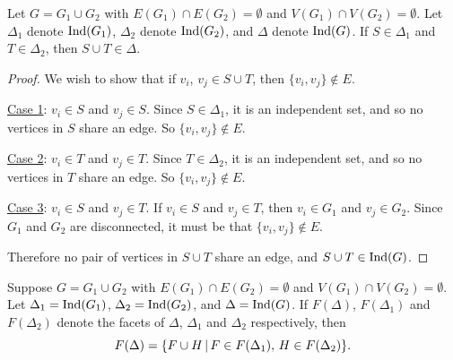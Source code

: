 \begin{lemma} \label{lem:ind-sets-union}
Let $G = G_1 \cup G_2$ with $E(G_1) \cap E(G_2) = \emptyset$ and $V(G_1) \cap V(G_2) = \emptyset$. Let $\Delta_1$ denote $\textrm{Ind}(G_1)$, $\Delta_2$ denote $\textrm{Ind}(G_2)$, and $\Delta$ denote $\textrm{Ind}(G)$. If $S \in \Delta_1$ and $T \in \Delta_2$, then $S \cup T \in \Delta$.  
\end{lemma}

\begin{proof} We wish to show that if $v_i$, $v_j \in S \cup T$, then  $\{v_i, v_j\} \not \in E$. 

\noindent
\underline{Case 1}: $v_i \in S$ and $v_j \in S$.
Since $S \in \Delta_1$, it is an independent set, and so no vertices in $S$ share an edge. So $\{v_i, v_j\} \not \in E.$

\noindent
\underline{Case 2}: $v_i \in T$ and $v_j \in T$. 
Since $T \in \Delta_2$, it is an independent set, and so no vertices in $T$ share an edge. So $\{v_i, v_j\} \not \in E$.

\noindent
\underline{Case 3}: $v_i \in S$ and $v_j \in T$. 
If $v_i \in S$ and $v_j \in T$, then $v_i \in G_1$ and $v_j \in G_2$. Since $G_1$ and $G_2$ are disconnected, it must be that $\{ v_i, v_j \} \not \in E$.

Therefore no pair of vertices in $S \cup T$ share an edge, and $S \cup T \in \textrm{Ind}(G)$. 
\end{proof}

\begin{lemma} \label{lem:section-facets}
Suppose $G = G_1 \cup G_2$ with $E(G_1) \cap E(G_2) = \emptyset$ and $V(G_1) \cap V(G_2) = \emptyset$. Let $\Delta_1 = \textrm{Ind}(G_1)$, $\Delta_2 = \textrm{Ind} (G_2)$, and $\Delta = \textrm{Ind} (G)$. If $F(\Delta)$, $F(\Delta_1)$ and $F(\Delta_2)$ denote the facets of $\Delta$, $\Delta_1$ and $\Delta_2$ respectively, then $$F(\Delta) = \{  F \cup H \, | \, F \in F(\Delta_1) , \, H \in F(\Delta_2) \}.$$
\end{lemma}

